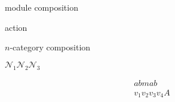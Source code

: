 \documentclass{amsart}
\begin{document}
\thispagestyle{empty}

module composition

action

$n$-category composition

\newcommand{\cN}{\mathcal{N}}
$\cN_1 \cN_2 \cN_3$

\begin{align*}
abmab & \\
v_1 v_2 v_3 v_4 A
\end{align*}
\end{document}

